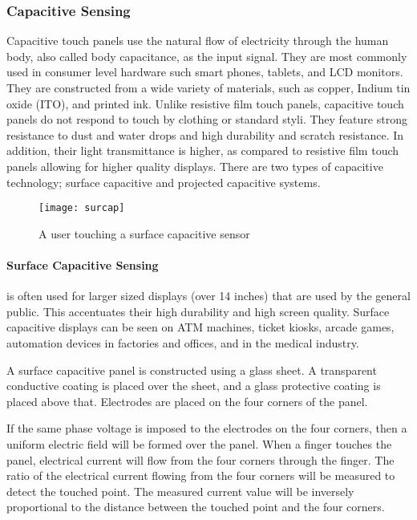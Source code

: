 \subsubsection{Capacitive Sensing}
Capacitive touch panels use the natural flow of electricity through the human body, also called body capacitance, as the input signal.
They are most commonly used in consumer level hardware such smart phones, tablets, and LCD monitors.
They are constructed from a wide variety of materials, such as copper, Indium tin oxide (ITO), and printed ink.
Unlike resistive film touch panels, capacitive touch panels do not respond to touch by clothing or standard styli.
They feature strong resistance to dust and water drops and high durability and scratch resistance. 
In addition, their light transmittance is higher, as compared to resistive film touch panels allowing for higher quality displays.
There are two types of capacitive technology; surface capacitive and projected capacitive systems.
 
\begin{center}
\begin{figure}
\texttt{[image: surcap]}
\caption{A user touching a surface capacitive sensor \cite{touchtech}}
\end{figure}
\end{center}

\paragraph{Surface Capacitive Sensing}

is often used for larger sized displays (over 14 inches) that are used by the general public.
This accentuates their high durability and high screen quality.
Surface capacitive displays can be seen on ATM machines, ticket kiosks, arcade games, automation devices in factories and offices, and in the medical industry.

A surface capacitive panel is constructed using a glass sheet. 
A transparent conductive coating is placed over the sheet, and a glass protective coating is placed above that. 
Electrodes are placed on the four corners of the panel. 

If the same phase voltage is imposed to the electrodes on the four corners, then a uniform electric field will be formed over the panel. 
When a finger touches the panel, electrical current will flow from the four corners through the finger. 
The ratio of the electrical current flowing from the four corners will be measured to detect the touched point. 
The measured current value will be inversely proportional to the distance between the touched point and the four corners.

